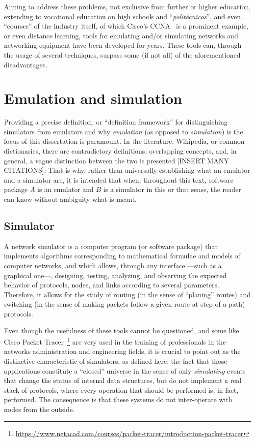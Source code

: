 Aiming to address these problems, not exclusive from further or higher education, extending to vocational education on high schools and ``\emph{politécnicos}'', and even ``courses'' of the industry itself, of which Cisco's CCNA~\cite{ccna} is a prominent example, or even distance learning, tools for emulating and/or simulating networks and networking equipment have been developed for years. %
These tools can, through the usage of several techniques, surpass some (if not all) of the aforementioned disadvantages.

\section{Emulation and simulation}
\label{sec:emulsimvirt}

Providing a precise definition, or ``definition framework'' for distinguishing simulators from emulators and why \emph{emulation} (as opposed to \emph{simulation}) is the focus of this dissertation is paramount.
In the literature, Wikipedia, or common dictionaries, there are contradictory definitions, overlapping concepts, and, in general, a vague distinction between the two is presented [INSERT MANY CITATIONS]. %
That is why, rather than universally establishing what an emulator and a simulator are, it is intended that when, throughout this text, software package $A$ is an emulator and $B$ is a simulator in this or that sense, the reader can know without ambiguity what is meant.

\subsection{Simulator}
\label{subsec:simulator}

A network simulator is a computer program (or software package) that implements algorithms corresponding to mathematical formulae and models of computer networks, and which allows, through any interface ---such as a graphical one---, designing, testing, analyzing, and observing the expected behavior of protocols, nodes, and links according to several parameters. Therefore, it allows for the study of routing (in the sense of ``planing'' routes) and switching (in the sense of making packets follow a given route at step of a path) protocols.

Even though the usefulness of these tools cannot be questioned, and some like Cisco Packet Tracer~\footnote{\url{https://www.netacad.com/courses/packet-tracer/introduction-packet-tracer}} are very used in the training of professionals in the networks administration and engineering fields, it is crucial to point out as the distinctive characteristic of simulators, as defined here, the fact that those applications constitute a ``closed'' universe in the sense of only \emph{simulating} events that change the status of internal data structures, but do not implement a real stack of protocols, where every operation that should be performed is, in fact, performed. %
The consequence is that these systems do not inter-operate with nodes from the outside.

